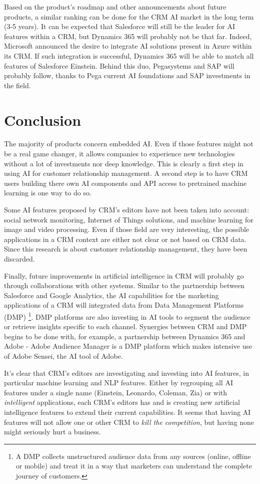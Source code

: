 Based on the product's roadmap and other announcements about future products, a similar ranking can be done for the CRM AI market in the long term (3-5 years). It can be expected that Salesforce will still be the leader for AI features within a CRM, but Dynamics 365 will probably not be that far. Indeed, Microsoft announced the desire to integrate AI solutions present in Azure within its CRM. If such integration is successful, Dynamics 365 will be able to match all features of Salesforce Einstein. Behind this duo, Pegasystems and SAP will probably follow, thanks to Pega current AI foundations and SAP investments in the field. 


\section{Conclusion}
The majority of products concern embedded AI. Even if those features might not be a real game changer, it allows companies to experience new technologies without a lot of investments nor deep knowledge. This is clearly a first step in using AI for customer relationship management. A second step is to have CRM users building there own AI components and API access to pretrained machine learning is one way to do so.

Some AI features proposed by CRM's editors have not been taken into account: social network monitoring, Internet of Things solutions, and machine learning for image and video processing. Even if those field are very interesting, the possible applications in a CRM context are either not clear or not based on CRM data. Since this research is about customer relationship management, they have been discarded.

Finally, future improvements in artificial intelligence in CRM will probably go through collaborations with other systems. Similar to the partnership between Salesforce and Google Analytics, the AI capabilities for the marketing applications of a CRM will integrated data from Data Management Platforms (DMP) \footnote{A DMP collects unstructured audience data from any sources (online, offline or mobile) and treat it in a way that marketers can understand the complete journey of customers.}. DMP platforms are also investing in AI tools to segment the audience or retrieve insights specific to each channel. Synergies between CRM and DMP begins to be done with, for example, a partnership between Dynamics 365 and Adobe - Adobe Audience Manager is a DMP platform which makes intensive use of Adobe Sensei, the AI tool of Adobe.

It's clear that CRM's editors are investigating and investing into AI features, in particular machine learning and NLP features. Either by regrouping all AI features under a single name (Einstein, Leonardo, Coleman, Zia) or with \textit{intelligent} applications, each CRM's editors has and is creating new artificial intelligence features to extend their current capabilities. It seems that having AI features will not allow one or other CRM to \textit{kill the competition}, but having none might seriously hurt a business.